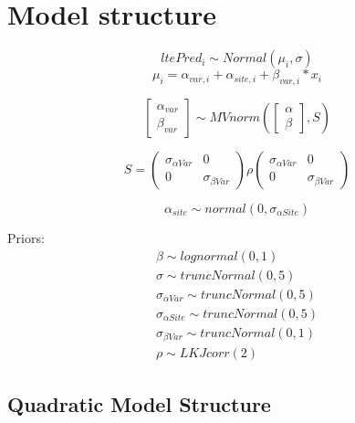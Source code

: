 \documentclass[11pt,letter]{article}
\begin{document}
\section{Model structure}

\begin{equation*}
ltePred_{i} \sim Normal(\mu_{i}, \sigma ) 
\end{equation*}
\begin{equation*}
\mu_{i} = \alpha_{var,i} + \alpha_{site, i}+ \beta_{var, i}\ast x_{i}
\end{equation*}

\begin{equation*}
\begin{bmatrix}
\alpha_{var} \\
\beta_{var}
\end{bmatrix}
\sim MVnorm
\left(
\begin{bmatrix}
\alpha \\
\beta
\end{bmatrix}
,S
\right)
\end{equation*}

\begin{equation*}
S = 
\begin{pmatrix}
\sigma_{\alpha Var} & 0 \\
0 & \sigma_{\beta Var} 
\end{pmatrix}
\rho
\begin{pmatrix}
\sigma_{\alpha Var} & 0 \\
0 & \sigma_{\beta Var} 
\end{pmatrix}
\end{equation*}

\begin{equation*}
\alpha_{site} \sim normal(0, \sigma_{\alpha Site}) 
\end{equation*}

Priors:
\begin{gather*}
\beta \sim lognormal(0,1)\\
\sigma \sim truncNormal(0,5)\\
\sigma_{\alpha Var} \sim truncNormal(0,5)\\
\sigma_{\alpha Site} \sim truncNormal(0,5)\\
\sigma_{\beta Var} \sim truncNormal(0,1)\\
\rho \sim LKJcorr (2)
\end{gather*}


\subsection{Quadratic Model Structure}
\end{document}
